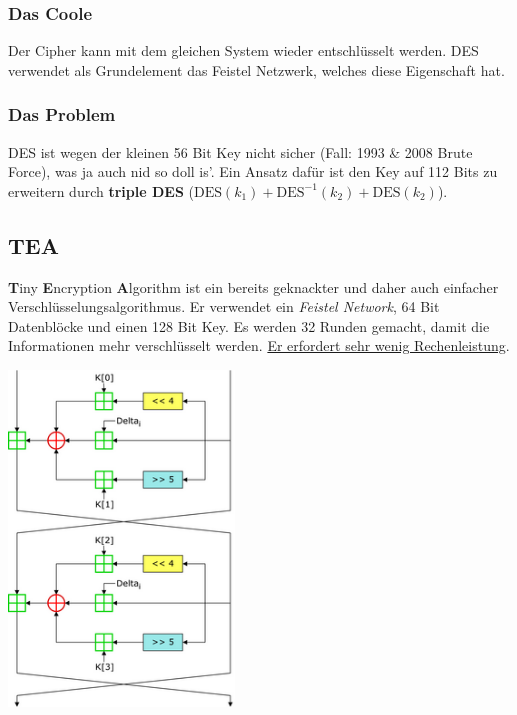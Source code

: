 \documentclass[
  10pt,
  a4paper,
]{article}
\begin{document}
\begin{multicols*}{2}
\subsubsection{Das Coole}\label{das-coole}

Der Cipher kann mit dem gleichen System wieder entschlüsselt werden. DES
verwendet als Grundelement das Feistel Netzwerk, welches diese
Eigenschaft hat.

\subsubsection{Das Problem}\label{das-problem}

DES ist wegen der kleinen 56 Bit Key nicht sicher (Fall: 1993 \& 2008
Brute Force), was ja auch nid so doll is'. Ein Ansatz dafür ist den Key
auf 112 Bits zu erweitern durch \textbf{triple DES}
(\(\text{DES}(k_1)+\text{DES}^{-1}(k_2)+\text{DES}(k_2)\)).

\subsection{\texorpdfstring{TEA
\href{https://www.youtube.com/watch?v=aR29pnuJ6fQ}{\color{BrickRed}\faYoutube}}{TEA }}\label{tea}

\textbf{T}iny \textbf{E}ncryption \textbf{A}lgorithm ist ein bereits
geknackter und daher auch einfacher Verschlüsselungsalgorithmus. Er
verwendet ein \emph{Feistel Network}, 64 Bit Datenblöcke und einen 128
Bit Key. Es werden 32 Runden gemacht, damit die Informationen mehr
verschlüsselt werden. \ul{Er erfordert sehr wenig Rechenleistung}.

\begin{center}
\includegraphics[width=6cm,height=\textheight]{images/crypto/TEA_InfoBox_Diagram.png}
\end{center}


\end{multicols*}
\end{document}
